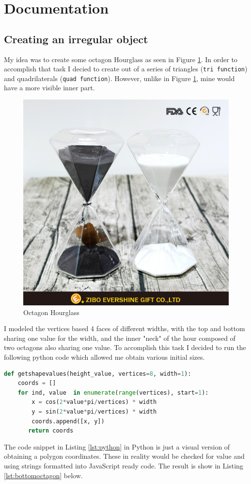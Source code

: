 \documentclass[12pt,a4paper]{article}
\begin{document}
\section{Documentation}
\subsection{Creating an irregular object}
My idea was to create some octagon Hourglass as seen in Figure \ref{img:hourglass}. In order to accomplish that task I decied to create out of a series of triangles (\texttt{tri function{}}) and quadrilaterals (\texttt{quad function{}}). However, unlike in  Figure \ref{img:hourglass}, mine would have a more visible inner part.  

\begin{figure}[H]
\begin{center}
\includegraphics[width=0.4\columnwidth, angle = 0]{img/hourglass.png}
\end{center}
\caption{Octagon Hourglass \cite{hourglass}}
\label{img:hourglass}
\end{figure}

I modeled the vertices based 4 faces of different widths, with the top and bottom sharing one value for the width, and the inner "neck" of the hour composed of two octagons also sharing one value. To accomplish this task I decided to run the following python code which allowed me obtain various initial sizes.

\begin{lstlisting}[caption={Getting values for the vertices},label={lst:python},language=python]
def getshapevalues(height_value, vertices=8, width=1):
    coords = []
    for ind, value  in enumerate(range(vertices), start=1):
        x = cos(2*value*pi/vertices) * width
        y = sin(2*value*pi/vertices) * width
        coords.append([x, y])
       return coords
\end{lstlisting}
The  code snippet in Listing \ref{lst:python} in Python is just a visual version of obtaining a polygon coordinates. These in reality would be checked for value and using strings formatted into JavaScript ready code. The result is show in Listing \ref{lst:bottomoctagon} below.
\end{document}
